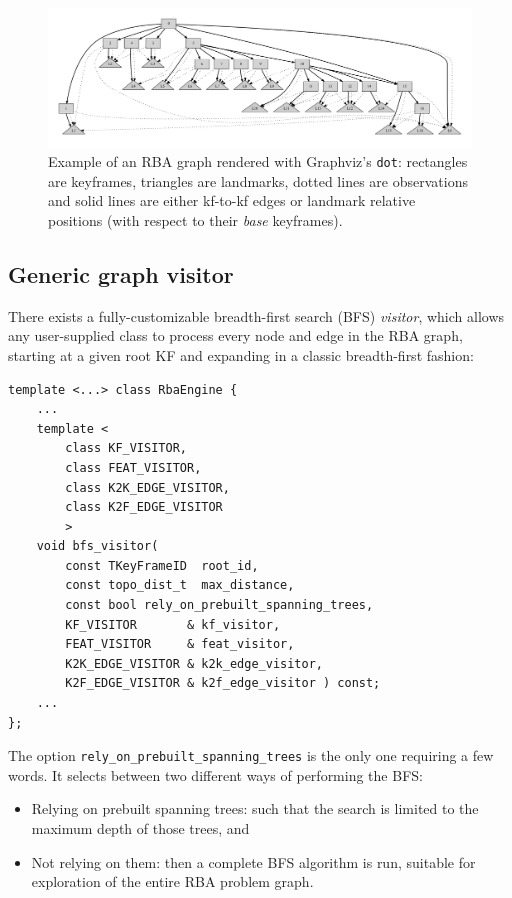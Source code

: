 \documentclass[a4paper,11pt]{article}
\begin{document}
\begin{figure}[h]
\centering
\includegraphics[width=1.0\textwidth]{imgs/example_final_graph.pdf} 
\caption{Example of an RBA graph rendered with Graphviz's \texttt{dot}: rectangles are keyframes, triangles are landmarks, 
dotted lines are observations and solid lines are either kf-to-kf edges or landmark relative positions 
(with respect to their \emph{base} keyframes).}
\label{fig:dot.graph}
\end{figure}

\newpage
\subsection{Generic graph visitor}

There exists a fully-customizable breadth-first search (BFS) \emph{visitor}, which allows any user-supplied 
class to process every node and edge in the RBA graph, starting at a given root KF 
and expanding in a classic breadth-first fashion:

\begin{lstlisting}
template <...> class RbaEngine {
    ...
	template <
		class KF_VISITOR,
		class FEAT_VISITOR,
		class K2K_EDGE_VISITOR,
		class K2F_EDGE_VISITOR
		>
	void bfs_visitor(
		const TKeyFrameID  root_id,
		const topo_dist_t  max_distance,
		const bool rely_on_prebuilt_spanning_trees,
		KF_VISITOR       & kf_visitor,
		FEAT_VISITOR     & feat_visitor,
		K2K_EDGE_VISITOR & k2k_edge_visitor,
		K2F_EDGE_VISITOR & k2f_edge_visitor ) const;
    ...
};
\end{lstlisting}

The option \texttt{rely\_on\_prebuilt\_spanning\_trees} is the only one requiring a few words.
It selects between two different ways of performing the BFS:
\begin{itemize}
 \item Relying on prebuilt spanning trees: such that the search is limited to the maximum depth of those trees, and 
 \item Not relying on them: then a complete BFS algorithm is run, suitable for exploration of the entire RBA problem graph.
\end{itemize}
\end{document}

